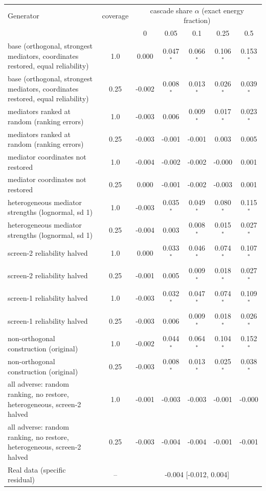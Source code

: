 \begin{tabular}{p{6.2cm}cccccc}
\toprule
Generator & coverage & \multicolumn{5}{c}{cascade share $\alpha$ (exact energy fraction)} \\
 & & 0 & 0.05 & 0.1 & 0.25 & 0.5 \\
\midrule
base (orthogonal, strongest mediators, coordinates restored, equal reliability) & 1.0 & 0.000 & 0.047$^\ast$ & 0.066$^\ast$ & 0.106$^\ast$ & 0.153$^\ast$ \\
base (orthogonal, strongest mediators, coordinates restored, equal reliability) & 0.25 & -0.002 & 0.008$^\ast$ & 0.013$^\ast$ & 0.026$^\ast$ & 0.039$^\ast$ \\
mediators ranked at random (ranking errors) & 1.0 & -0.003 & 0.006 & 0.009$^\ast$ & 0.017$^\ast$ & 0.023$^\ast$ \\
mediators ranked at random (ranking errors) & 0.25 & -0.003 & -0.001 & -0.001 & 0.003 & 0.005 \\
mediator coordinates not restored & 1.0 & -0.004 & -0.002 & -0.002 & -0.000 & 0.001 \\
mediator coordinates not restored & 0.25 & 0.000 & -0.001 & -0.002 & -0.003 & 0.001 \\
heterogeneous mediator strengths (lognormal, sd 1) & 1.0 & -0.003 & 0.035$^\ast$ & 0.049$^\ast$ & 0.080$^\ast$ & 0.115$^\ast$ \\
heterogeneous mediator strengths (lognormal, sd 1) & 0.25 & -0.004 & 0.003 & 0.008$^\ast$ & 0.015$^\ast$ & 0.027$^\ast$ \\
screen-2 reliability halved & 1.0 & 0.000 & 0.033$^\ast$ & 0.046$^\ast$ & 0.074$^\ast$ & 0.107$^\ast$ \\
screen-2 reliability halved & 0.25 & -0.001 & 0.005 & 0.009$^\ast$ & 0.018$^\ast$ & 0.027$^\ast$ \\
screen-1 reliability halved & 1.0 & -0.003 & 0.032$^\ast$ & 0.047$^\ast$ & 0.074$^\ast$ & 0.109$^\ast$ \\
screen-1 reliability halved & 0.25 & -0.003 & 0.006 & 0.009$^\ast$ & 0.018$^\ast$ & 0.026$^\ast$ \\
non-orthogonal construction (original) & 1.0 & -0.002 & 0.044$^\ast$ & 0.064$^\ast$ & 0.104$^\ast$ & 0.152$^\ast$ \\
non-orthogonal construction (original) & 0.25 & -0.003 & 0.008$^\ast$ & 0.013$^\ast$ & 0.025$^\ast$ & 0.038$^\ast$ \\
all adverse: random ranking, no restore, heterogeneous, screen-2 halved & 1.0 & -0.001 & -0.003 & -0.003 & -0.001 & -0.000 \\
all adverse: random ranking, no restore, heterogeneous, screen-2 halved & 0.25 & -0.003 & -0.004 & -0.004 & -0.001 & -0.001 \\
\midrule
Real data (specific residual) & -- & \multicolumn{5}{c}{-0.004 [-0.012, 0.004]} \\
\bottomrule
\end{tabular}